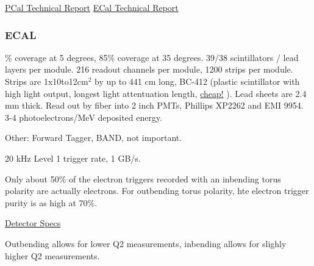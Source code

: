\href{https://www.sciencedirect.com/science/article/pii/S0168900220300309?via\%3Dihub}{PCal Technical Report}
\href{https://www.sciencedirect.com/science/article/pii/S0168900200009967}{ECal Technical Report}

                
            \subsubsection{ECAL}
                \% coverage at 5 degrees, 85\% coverage at 35 degrees. 39/38 scintillators / lead layers per module. 216 readout channels per module, 1200 strips per module. Strips are 1x10to12cm$^2$ by up to 441 cm long, BC-412 (plastic scintillator with high light output, longest light attentuation length, \href{https://www.crystals.saint-gobain.com/products/bc-408-bc-412-bc-416}{cheap!} ). Lead sheets are 2.4 mm thick. Read out by fiber into 2 inch PMTs, Phillips XP2262 and EMI 9954. 3-4 photoelectrons/MeV deposited energy. 

    


Other:
Forward Tagger, BAND, not important.

20 kHz Level 1 trigger rate, 1 GB/s.

Only about 50\% of the electron triggers recorded with an inbending torus polarity are actually electrons. For outbending torus polarity, hte electron trigger purity is as high at 70\%. 

\href{https://www.jlab.org/Hall-B/clas12-web/}{Detector Specs}



Outbending allows for lower Q2 measurements, inbending allows for slighly higher Q2 measurements. 


